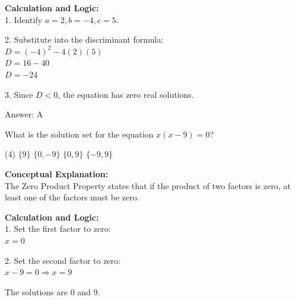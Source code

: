 \documentclass[11pt,paper=a4,answers]{exam}
\begin{document}
\begin{questions}
\begin{solution}
\vspace{15pt}

\textbf{Calculation and Logic:} \\
1. Identify $a = 2, b = -4, c = 5$.

\vspace{10pt}

2. Substitute into the discriminant formula: \\
   $D = (-4)^2 - 4(2)(5)$ \\
   $D = 16 - 40$ \\
   $D = -24$

\vspace{10pt}

3. Since $D < 0$, the equation has zero real solutions.

\vspace{20pt}

Answer: \colorbox{yellow!100}{A}
\end{solution}

\vspace{30pt}

\question
What is the solution set for the equation $x(x - 9) = 0$?
\begin{tasks}(4)
    \task $\{9\}$
    \task $\{0, -9\}$
    \task $\{0, 9\}$
    \task $\{-9, 9\}$
\end{tasks}

\begin{solution}
\textbf{Conceptual Explanation:} \\
The Zero Product Property states that if the product of two factors is zero, at least one of the factors must be zero.

\vspace{15pt}

\textbf{Calculation and Logic:} \\
1. Set the first factor to zero: \\
   $x = 0$

\vspace{10pt}

2. Set the second factor to zero: \\
   $x - 9 = 0 \Rightarrow x = 9$

\vspace{10pt}

The solutions are 0 and 9.

\vspace{20pt}


\end{solution}
\end{questions}
\end{document}
